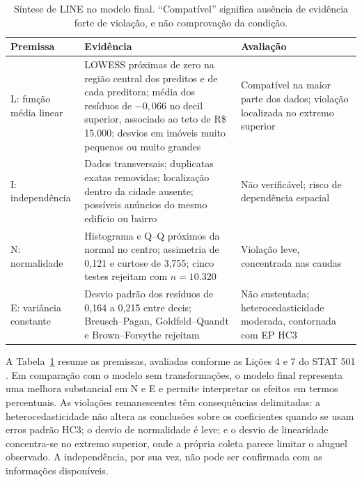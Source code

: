 \documentclass[12pt,a4paper]{article}
\begin{document}
\begin{table}[H]
\centering
\caption{Síntese de LINE no modelo final. ``Compatível'' significa ausência de evidência forte de violação, e não comprovação da condição.}
\label{tab:line}
\footnotesize
\begin{tabular}{>{\raggedright\arraybackslash}p{2.5cm}
                >{\raggedright\arraybackslash}p{6.0cm}
                >{\raggedright\arraybackslash}p{5.0cm}}
\toprule
Premissa & Evidência & Avaliação \\
\midrule
L: função média linear & LOWESS próximas de zero na região central dos preditos e de cada preditora; média dos resíduos de $-0{,}066$ no decil superior, associado ao teto de R\$ 15.000; desvios em imóveis muito pequenos ou muito grandes & Compatível na maior parte dos dados; violação localizada no extremo superior \\
\addlinespace
I: independência & Dados transversais; duplicatas exatas removidas; localização dentro da cidade ausente; possíveis anúncios do mesmo edifício ou bairro & Não verificável; risco de dependência espacial \\
\addlinespace
N: normalidade & Histograma e Q--Q próximos da normal no centro; assimetria de 0,121 e curtose de 3,755; cinco testes rejeitam com $n=10.320$ & Violação leve, concentrada nas caudas \\
\addlinespace
E: variância constante & Desvio padrão dos resíduos de 0,164 a 0,215 entre decis; Breusch--Pagan, Goldfeld--Quandt e Brown--Forsythe rejeitam & Não sustentada; heterocedasticidade moderada, contornada com EP HC3 \\
\bottomrule
\end{tabular}
\end{table}

A Tabela~\ref{tab:line} resume as premissas, avaliadas conforme as Lições 4 e 7 do STAT 501 \cite{stat501}. Em comparação com o modelo sem transformações, o modelo final representa uma melhora substancial em N e E e permite interpretar os efeitos em termos percentuais. As violações remanescentes têm consequências delimitadas: a heterocedasticidade não altera as conclusões sobre os coeficientes quando se usam erros padrão HC3; o desvio de normalidade é leve; e o desvio de linearidade concentra-se no extremo superior, onde a própria coleta parece limitar o aluguel observado. A independência, por sua vez, não pode ser confirmada com as informações disponíveis.

\end{document}
